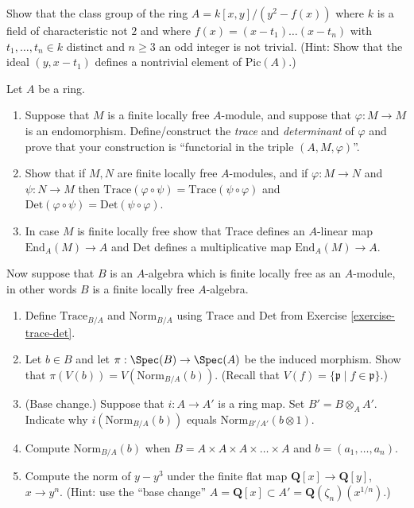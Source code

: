 \begin{exercise}
\label{exercise-class-group-not-trivial}
Show that the class group of the ring
$A = k[x, y]/(y^2 - f(x))$ where $k$ is a field of characteristic not $2$
and where $f(x) = (x - t_1) \ldots (x - t_n)$ with $t_1, \ldots, t_n \in k$
distinct and $n \geq 3$ an odd integer is not trivial. (Hint: Show that the
ideal $(y, x - t_1)$ defines a nontrivial element of $\text{Pic}(A)$.)
\end{exercise}

\begin{exercise}
\label{exercise-trace-det}
Let $A$ be a ring.
\begin{enumerate}
\item Suppose that $M$ is a finite locally free $A$-module, and
suppose that $\varphi : M \to M$ is an endomorphism. Define/construct
the {\it trace}  and {\it determinant} of $\varphi$ and prove that your
construction is ``functorial in the triple $(A, M, \varphi)$''.
\item Show that if $M, N$ are finite locally free $A$-modules,
and if $\varphi : M \to N$ and $\psi : N \to M$ then
$\text{Trace}(\varphi \circ \psi) = \text{Trace}(\psi \circ \varphi)$ and
$\text{Det}(\varphi \circ \psi) = \text{Det}(\psi \circ \varphi)$.
\item In case $M$ is finite locally free show that
$\text{Trace}$ defines an $A$-linear map $\text{End}_A(M) \to A$ and
$\text{Det}$ defines a multiplicative map $\text{End}_A(M) \to A$.
\end{enumerate}
\end{exercise}

\begin{exercise}
\label{exercise-trace-det-rings}
Now suppose that $B$ is an $A$-algebra which is finite
locally free as an $A$-module, in other words $B$ is a finite locally
free $A$-algebra.
\begin{enumerate}
\item Define $\text{Trace}_{B/A}$ and $\text{Norm}_{B/A}$ using
$\text{Trace}$ and $\text{Det}$ from Exercise \ref{exercise-trace-det}.
\item Let $b\in B$ and let $\pi : \Spec(B) \to \Spec(A)$ be
the induced morphism. Show that $\pi(V(b)) = V(\text{Norm}_{B/A}(b))$.
(Recall that $V(f) = \{ {\mathfrak p} \mid f \in {\mathfrak p}\}$.)
\item (Base change.) Suppose that $i : A \to A'$ is a ring map. Set
$B' = B \otimes_A A'$. Indicate why $i(\text{Norm}_{B/A}(b))$ equals
$\text{Norm}_{B'/A'}(b \otimes 1)$.
\item Compute $\text{Norm}_{B/A}(b)$ when
$B = A \times A \times A \times \ldots \times A$
and $b = (a_1, \ldots, a_n)$.
\item Compute the norm of $y-y^3$ under the finite flat
map ${\mathbf Q}[x] \to {\mathbf Q}[y]$, $x \to y^n$. (Hint: use
the ``base change''
$A = {\mathbf Q}[x] \subset A' = {\mathbf Q}(\zeta_n)(x^{1/n})$.)
\end{enumerate}
\end{exercise}



